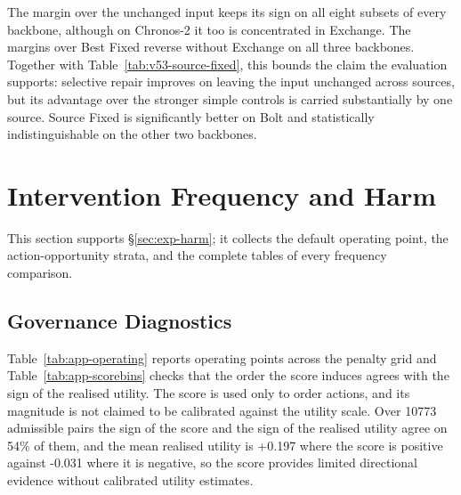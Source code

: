 \documentclass{article}
\begin{document}
The margin over the unchanged input keeps its sign on all eight subsets of every backbone,
although on Chronos-2 it too is concentrated in Exchange. The margins over Best Fixed
reverse without Exchange on all three backbones. Together with
Table~\ref{tab:v53-source-fixed}, this bounds the claim the evaluation supports: selective
repair improves on leaving the input unchanged across sources, but its advantage over the
stronger simple controls is carried substantially by one source. Source Fixed is significantly
better on Bolt and statistically indistinguishable on the other two backbones.

\section{Intervention Frequency and Harm}

This section supports \S\ref{sec:exp-harm}; it collects the default operating point, the
action-opportunity strata, and the complete tables of every frequency comparison.

\subsection{Governance Diagnostics}
\label{app:governance-fig}
Table~\ref{tab:app-operating} reports operating points across the penalty grid and
Table~\ref{tab:app-scorebins} checks that the order the score induces agrees with the sign of
the realised utility. The score is used only to order actions, and its magnitude is not claimed
to be calibrated against the utility scale. Over 10773 admissible pairs the sign of the score and the sign of the realised utility agree on 54\% of them, and the mean realised utility is +0.197 where the score is positive against -0.031 where it is negative, so the score provides limited directional evidence without calibrated utility estimates.
\end{document}
